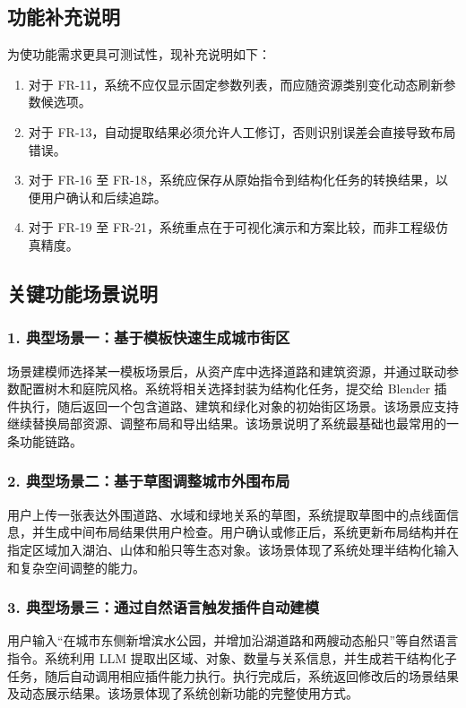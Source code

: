 \documentclass[UTF8,a4paper,10pt]{ctexart}
\begin{document}
\subsection{功能补充说明}
为使功能需求更具可测试性，现补充说明如下：
\begin{enumerate}[label=\arabic*.]
    \item 对于 FR-11，系统不应仅显示固定参数列表，而应随资源类别变化动态刷新参数候选项。
    \item 对于 FR-13，自动提取结果必须允许人工修订，否则识别误差会直接导致布局错误。
    \item 对于 FR-16 至 FR-18，系统应保存从原始指令到结构化任务的转换结果，以便用户确认和后续追踪。
    \item 对于 FR-19 至 FR-21，系统重点在于可视化演示和方案比较，而非工程级仿真精度。
\end{enumerate}

\subsection{关键功能场景说明}
\subsubsection*{1. 典型场景一：基于模板快速生成城市街区}
场景建模师选择某一模板场景后，从资产库中选择道路和建筑资源，并通过联动参数配置树木和庭院风格。系统将相关选择封装为结构化任务，提交给 Blender 插件执行，随后返回一个包含道路、建筑和绿化对象的初始街区场景。该场景应支持继续替换局部资源、调整布局和导出结果。该场景说明了系统最基础也最常用的一条功能链路。

\subsubsection*{2. 典型场景二：基于草图调整城市外围布局}
用户上传一张表达外围道路、水域和绿地关系的草图，系统提取草图中的点线面信息，并生成中间布局结果供用户检查。用户确认或修正后，系统更新布局结构并在指定区域加入湖泊、山体和船只等生态对象。该场景体现了系统处理半结构化输入和复杂空间调整的能力。

\subsubsection*{3. 典型场景三：通过自然语言触发插件自动建模}
用户输入“在城市东侧新增滨水公园，并增加沿湖道路和两艘动态船只”等自然语言指令。系统利用 LLM 提取出区域、对象、数量与关系信息，并生成若干结构化子任务，随后自动调用相应插件能力执行。执行完成后，系统返回修改后的场景结果及动态展示结果。该场景体现了系统创新功能的完整使用方式。
\end{document}
